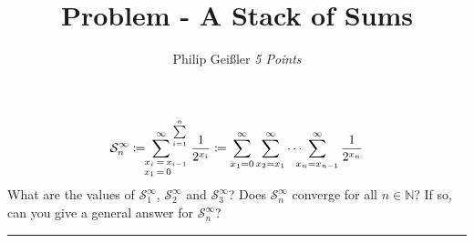 \documentclass[12pt, a4paper]{article}
\newcommand{\rom}[1]{\uppercase\expandafter{\romannumeral #1\relax}}
\begin{document}
\title{Problem \rom{3} - A Stack of Sums}
\author{Philip Gei\ss{}ler \hspace{5cm} \textit{5 Points}}
\date{}
\maketitle
\vspace*{-.9cm}

\begin{align*}
\mathcal{S}_{n}^\infty \coloneqq {\text{\hspace{-4.9mm}}\sum\limits^{\infty}_{\phantom{...}\begin{smallmatrix*}x_i\!&=&\!x_{i-1}\\x_1\!&=&\!0\hfill\end{smallmatrix*}}}^{\text{\hspace{-5mm}}\sum\limits^{n}_{i=1}}\hspace{1mm}\frac{1}{2^{x_i}} \coloneqq \sum^{\infty}_{x_1 = 0}\sum^{\infty}_{x_2 = x_1}\cdots\hspace{-2.3mm}\sum^{\infty}_{x_n = x_{n-1}}\frac{1}{2^{x_n}}
\end{align*}
What are the values of $\mathcal{S}_{1}^\infty$, $\mathcal{S}_{2}^\infty$ and $\mathcal{S}_{3}^\infty$? Does $\mathcal{S}_{n}^\infty$ converge for all $n\in\mathbb{N}$? If so, can you give a general answer for $\mathcal{S}_{n}^\infty$?
\hrule
\vspace*{9mm}
\end{document}
